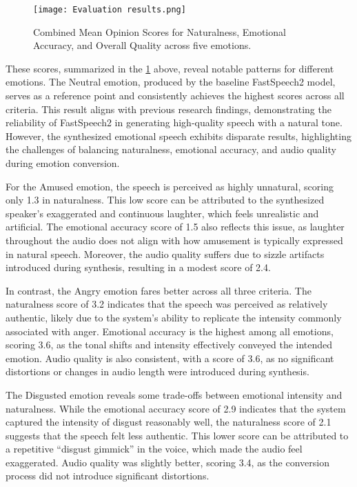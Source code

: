 \begin{figure}[h!]
    \centering
    \texttt{[image: Evaluation results.png]}
    \caption{Combined Mean Opinion Scores for Naturalness, Emotional Accuracy, and Overall Quality across five emotions.}
    \vspace{0.1cm}
    \label{fig:MOS_graph}
\end{figure}

These scores, summarized in the \ref{fig:MOS_graph} above, reveal notable patterns for different emotions. The Neutral emotion, produced by the baseline FastSpeech2 model, serves as a reference point and consistently achieves the highest scores across all criteria. This result aligns with previous research findings, demonstrating the reliability of FastSpeech2 in generating high-quality speech with a natural tone. However, the synthesized emotional speech exhibits disparate results, highlighting the challenges of balancing naturalness, emotional accuracy, and audio quality during emotion conversion.

For the Amused emotion, the speech is perceived as highly unnatural, scoring only 1.3 in naturalness. This low score can be attributed to the synthesized speaker’s exaggerated and continuous laughter, which feels unrealistic and artificial. The emotional accuracy score of 1.5 also reflects this issue, as laughter throughout the audio does not align with how amusement is typically expressed in natural speech. Moreover, the audio quality suffers due to sizzle artifacts introduced during synthesis, resulting in a modest score of 2.4.

In contrast, the Angry emotion fares better across all three criteria. The naturalness score of 3.2 indicates that the speech was perceived as relatively authentic, likely due to the system’s ability to replicate the intensity commonly associated with anger. Emotional accuracy is the highest among all emotions, scoring 3.6, as the tonal shifts and intensity effectively conveyed the intended emotion. Audio quality is also consistent, with a score of 3.6, as no significant distortions or changes in audio length were introduced during synthesis.

The Disgusted emotion reveals some trade-offs between emotional intensity and naturalness. While the emotional accuracy score of 2.9 indicates that the system captured the intensity of disgust reasonably well, the naturalness score of 2.1 suggests that the speech felt less authentic. This lower score can be attributed to a repetitive “disgust gimmick” in the voice, which made the audio feel exaggerated. Audio quality was slightly better, scoring 3.4, as the conversion process did not introduce significant distortions.

